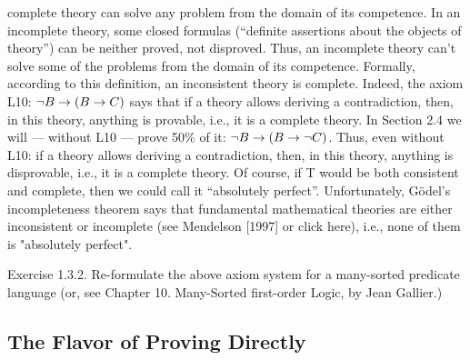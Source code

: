 complete theory can solve any problem from the domain of its competence.
In an incomplete theory, some closed formulas (``definite assertions about the objects of theory'') can be
neither proved, not disproved. Thus, an incomplete theory can't solve some of the problems from the
domain of its competence.
Formally, according to this definition, an inconsistent theory is complete. Indeed, the axiom L10:
\(\neg B\rightarrow (B\rightarrow C)\) says that if a theory allows deriving a contradiction, then, in this theory, anything is
provable, i.e., it is a complete theory. In Section 2.4 we will --- without L10 --- prove 50\% of it:
\(\neg B\rightarrow (B\rightarrow \neg C)\). Thus, even without L10: if a theory allows deriving a contradiction, then, in this theory,
anything is disprovable, i.e., it is a complete theory.
Of course, if T would be both consistent and complete, then we could call it ``absolutely perfect''.
Unfortunately, G\"{o}del's incompleteness theorem says that fundamental mathematical theories are
either inconsistent or incomplete (see Mendelson [1997] or click here), i.e., none of them is "absolutely
perfect".

Exercise 1.3.2. Re-formulate the above axiom system for a many-sorted predicate language (or, see Chapter 10. Many-Sorted first-order Logic, by Jean Gallier.)

\subsection{The Flavor of Proving Directly}

